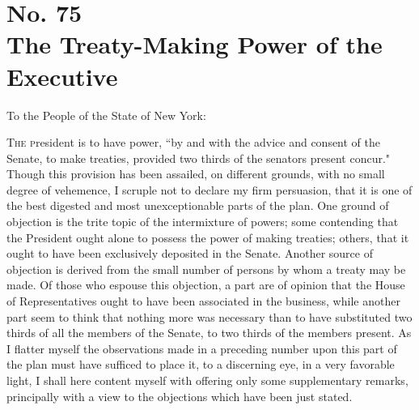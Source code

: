 \chapter[No. 75: The Treaty-Making Power of the Executive]{No. 75\\ {\small The Treaty-Making Power of the Executive}}
To the People of the State of New York:
\vspace{.4cm}

\textsc{The p}resident is to have power, ``by and with the advice and consent of the Senate, to make treaties, provided two thirds of the senators present concur." Though this provision has been assailed, on different grounds, with no small degree of vehemence, I scruple not to declare my firm persuasion, that it is one of the best digested and most unexceptionable parts of the plan. One ground of objection is the trite topic of the intermixture of powers; some contending that the President ought alone to possess the power of making treaties; others, that it ought to have been exclusively deposited in the Senate. Another source of objection is derived from the small number of persons by whom a treaty may be made. Of those who espouse this objection, a part are of opinion that the House of Representatives ought to have been associated in the business, while another part seem to think that nothing more was necessary than to have substituted two thirds of all the members of the Senate, to two thirds of the members present. As I flatter myself the observations made in a preceding number upon this part of the plan must have sufficed to place it, to a discerning eye, in a very favorable light, I shall here content myself with offering only some supplementary remarks, principally with a view to the objections which have been just stated.


